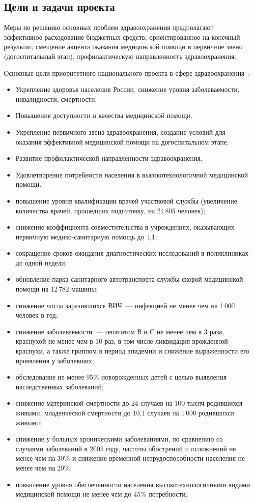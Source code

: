 \documentclass[article, 12pt, russian, oneside]{ncc}
\begin{document}
\subsection{Цели и задачи проекта}

Меры по решению основных проблем здравоохранения предполагают
эффективное расходование бюджетных средств, ориентированное на
конечный результат, смещение акцента оказания медицинской помощи в
первичное звено (догоспитальный этап), профилактическую направленность
здравоохранения.

Основные цели приоритетного национального проекта в сфере
здравоохранения~\cite{Health_Goals}:

\begin{itemize}
\item Укрепление здоровья населения России, снижение уровня
  заболеваемости, инвалидности, смертности.
\item Повышение доступности и качества медицинской помощи.
\item Укрепление первичного звена здравоохранения, создание условий
  для оказания эффективной медицинской помощи на догоспитальном этапе.
\item Развитие профилактической направленности здравоохранения.
\item Удовлетворение потребности населения в высокотехнологичной
  медицинской помощи.
\item повышение уровня квалификации врачей участковой службы
  (увеличение количества врачей, прошедших подготовку, на 24\,805
  человек);
\item снижение коэффициента совместительства в учреждениях,
  оказывающих первичную медико-санитарную помощь до 1,1;
\item сокращение сроков ожидания диагностических исследований в
  поликлиниках до одной недели;
\item обновление парка санитарного автотранспорта службы скорой
  медицинской помощи на 12\,782 машины;
\item снижение числа заразившихся ВИЧ~--- инфекцией не менее чем на
  1\,000 человек в год;
\item снижение заболеваемости~--- гепатитом В и С не менее чем в 3
  раза, краснухой не менее чем в 10 раз, в том числе ликвидация
  врожденной краснухи, а также гриппом в период эпидемии и снижение
  выраженности его проявления у заболевших;
\item обследование не менее 95\% новорожденных детей с целью выявления
  наследственных заболеваний;
\item снижение материнской смертности до 24 случаев на 100 тысяч
  родившихся живыми, младенческой смертности до 10,1 случаев на 1\,000
  родившихся живыми;
\item снижение у больных хроническими заболеваниями, по сравнению со
  случаями заболеваний в 2005 году, частоты обострений и осложнений не
  менее чем на 30\% и снижение временной нетрудоспособности населения
  не менее чем на 20\%;
\item повышение уровня обеспеченности населения высокотехнологичными
  видами медицинской помощи не менее чем до 45\% потребности.
\end{itemize}
\end{document}
